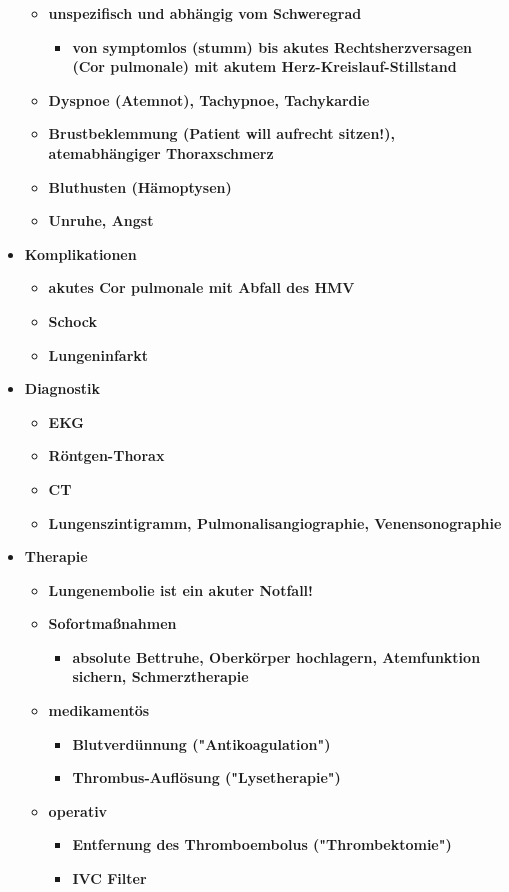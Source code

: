 \begin{itemize}
					\begin{itemize}
						\item \textbf{unspezifisch und abhängig vom Schweregrad}
							\begin{itemize}
								\item \textbf{von symptomlos (stumm) bis akutes Rechtsherzversagen (Cor pulmonale) mit akutem Herz-Kreislauf-Stillstand}
							\end{itemize}
						\item \textbf{Dyspnoe (Atemnot), Tachypnoe, Tachykardie}
						\item \textbf{Brustbeklemmung (Patient will aufrecht sitzen!), atemabhängiger Thoraxschmerz}
						\item \textbf{Bluthusten (Hämoptysen)}
						\item \textbf{Unruhe, Angst}
					\end{itemize}
				\item \textbf{Komplikationen}
					\begin{itemize}
						\item \textbf{akutes Cor pulmonale mit Abfall des HMV}
						\item \textbf{Schock}
						\item \textbf{Lungeninfarkt}
					\end{itemize}
				\item \textbf{Diagnostik}
					\begin{itemize}
						\item \textbf{EKG}
						\item \textbf{Röntgen-Thorax}
						\item \textbf{CT}
						\item \textbf{Lungenszintigramm, Pulmonalisangiographie, Venensonographie}
					\end{itemize}
				\item \textbf{Therapie}
					\begin{itemize}
						\item \textbf{Lungenembolie ist ein akuter Notfall!}
						\item \textbf{Sofortmaßnahmen}
							\begin{itemize}
								\item \textbf{absolute Bettruhe, Oberkörper hochlagern, Atemfunktion sichern, Schmerztherapie}
							\end{itemize}
						\item \textbf{medikamentös}
							\begin{itemize}
								\item \textbf{Blutverdünnung ("Antikoagulation")}
								\item \textbf{Thrombus-Auflösung ("Lysetherapie")}
							\end{itemize}
						\item \textbf{operativ}
							\begin{itemize}
								\item \textbf{Entfernung des Thromboembolus ("Thrombektomie")}
								\item \textbf{IVC Filter}
							\end{itemize}
					\end{itemize}
			\end{itemize}

